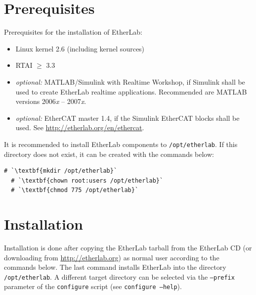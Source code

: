 
\section{Prerequisites}

Prerequisites for the installation of EtherLab:

\begin{itemize}

\item Linux kernel 2.6 (including kernel sources)

\item RTAI $\ge$ 3.3

\item {\it optional:} MATLAB/Simulink with Realtime Workshop, if Simulink
shall be used to create EtherLab realtime applications. Recommended are MATLAB
versions 2006{\it x} -- 2007{\it x}.

\item {\it optional:} EtherCAT master 1.4, if the Simulink EtherCAT blocks
shall be used. See \url{http://etherlab.org/en/ethercat}.

\end{itemize}

It is recommended to install EtherLab components to \texttt{/opt/etherlab}. If
this directory does not exist, it can be created with the commands below:

\begin{lstlisting}[gobble=2]
  # `\textbf{mkdir /opt/etherlab}`
  # `\textbf{chown root:users /opt/etherlab}`
  # `\textbf{chmod 775 /opt/etherlab}`
\end{lstlisting}


\section{Installation}
\label{sec:inst-paket}

Installation is done after copying the EtherLab tarball from the EtherLab CD
(or downloading from \url{http://etherlab.org}) as normal user according to
the commands below. The last command installs EtherLab into the directory
\texttt{/opt/etherlab}. A different target directory can be selected via the
\texttt{--prefix} parameter of the \texttt{configure} script (see
\texttt{configure --help}).

